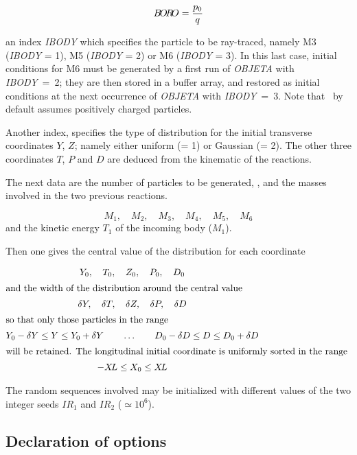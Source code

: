 $$ B\!O\!R\!O = \dfrac{p_0 }{ q} $$

\noindent an index \textsl{IBODY} which specifies the particle to be ray-traced, namely
M3 (\textsl{IBODY} = 1),  M5 (\textsl{IBODY} = 2) or M6 (\textsl{IBODY} = 3).  In this last case, 
initial conditions for M6 must be generated by a first run of \textsl{OBJETA} with 
\mbox{\textsl{IBODY} = 2};  they are then stored in a buffer array, and restored as initial conditions
at the next occurrence of \textsl{OBJETA} with \mbox{\textsl{IBODY} = 3}. Note that
\zgou\ by default assumes positively charged particles.  
\bigskip

\noindent Another index, \KOBJ specifies the type of
distribution for the initial transverse coordinates $ Y$, $Z $;   
namely either uniform (\KOBJ = 1) or Gaussian 
(\KOBJ = 2).  The other three coordinates $ T$, $P$ and $ D $ are 
deduced from the kinematic of the reactions.   
\bigskip

\noindent The next data are the number of particles to be generated, 
\IMAX{}, and the masses involved  in the two previous
reactions. 
 
 $$ M_1,\quad M_2,\quad M_3,\quad M_4,\quad M_5,\quad M_6 $$
%
 and the kinetic energy $ T_1 $ of the incoming body ($M_1$). 
 
\noindent Then one gives the central value of the distribution for each
coordinate 

\begin{gather*}
	Y_0,\quad T_0,\quad Z_0,\quad P_0,\quad D_0    \\
\intertext{and the width of the distribution around the central value }
	 \delta Y,\quad \delta T,\quad \delta Z,\quad \delta P,\quad \delta D \\
\intertext{so that only those particles in the range }
	Y_0-\delta Y\leq Y\leq Y_0+\delta Y\qquad \ldots \qquad D_0-\delta
	D\leq D\leq D_0+\delta D  \\
\intertext{will be retained.  The longitudinal initial coordinate is uniformly
	sorted in the range }
	 -X\!L \leq  X_0 \leq  X\!L 
\end{gather*}
 
\noindent The random sequences involved may be initialized with different
values of the 
two integer seeds $ IR_1 $ and $ IR_2 $ ($\simeq 10^6 $). 

\newpage

\subsection{Declaration of options} \label{sec4.3}

